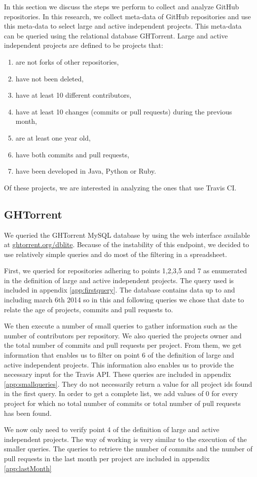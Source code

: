In this section we discuss the steps we perform to collect and analyze GitHub repositories.
In this research, we collect meta-data of GitHub repositories and use this meta-data to select large and active independent projects.
This meta-data can be queried using the relational database GHTorrent. \cite{ghtorrent}
Large and active independent projects are defined to be projects that:
\begin{enumerate}
\item are not forks of other repositories,
\item have not been deleted,
\item have at least 10 different contributors,
\item have at least 10 changes (commits or pull requests) during the previous month,
\item are at least one year old,
\item have both commits and pull requests,
\item have been developed in Java, Python or Ruby.
\end{enumerate}
Of these projects, we are interested in analyzing the ones that use Travis CI.

\subsection{GHTorrent}
We queried the GHTorrent MySQL database by using the web interface available at \url{ghtorrent.org/dblite}. 
Because of the instability of this endpoint, we decided to use relatively simple queries and do most of the filtering in a spreadsheet.

First, we queried for repositories adhering to points 1,2,3,5 and 7 as enumerated in the definition of large and active independent projects.
The query used is included in appendix \ref{app:firstquery}.
The database contains data up to and including march 6th 2014 so in this and following queries we chose that date to relate the age of projects, commits and pull requests to.

We then execute a number of small queries to gather information such as the number of contributors per repository. 
We also queried the projects owner and the total number of commits and pull requests per project. 
From them, we get information that enables us to filter on point 6 of the definition of large and active independent projects. 
This information also enables us to provide the necessary input for the Travis API.
These queries are included in appendix \ref{app:smallqueries}. 
They do not necessarily return a value for all project ids found in the first query.
In order to get a complete list, we add values of 0 for every project for which no total number of commits or total number of pull requests has been found.

We now only need to verify point 4 of the definition of large and active independent projects. 
The way of working is very similar to the execution of the smaller queries. 
The queries to retrieve the number of commits and the number of pull requests in the last month per project are included in appendix \ref{app:lastMonth}


